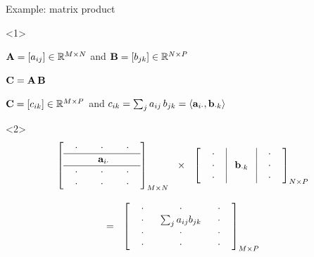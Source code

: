 \documentclass[12pt,aspectratio=1610]{beamer}
\begin{document}
\begin{frame}{Example: matrix product}

\begin{onlyenv}<1>
\begin{center}
$\mathbf{A} = [a_{ij}] \in \mathbb{R}^{M\times N}$ and $\mathbf{B} = [b_{jk}] \in \mathbb{R}^{N\times P}$\bigskip\bigskip

$\mathbf{C} = \mathbf{A} \,\mathbf{B}$\bigskip\bigskip

$\mathbf{C} = [c_{ik}] \in \mathbb{R}^{M\times P}$ and $c_{ik} = \sum_j a_{ij}\,b_{jk} = \langle \mathbf{a}_{i \cdot}, \mathbf{b}_{\cdot k} \rangle$
\end{center}
\end{onlyenv}

\begin{onlyenv}<2>
\footnotesize
\[
\begin{array}{c}
\left[\begin{array}{ccc}
\ \ \cdot \ \ & \ \ \cdot \ \  & \ \ \cdot \ \ \\
\hline
& \ \mb a_{i\cdot} & \\
 \hline
\ \ \cdot \ \ & \ \ \cdot \ \  & \ \ \cdot \ \ \\
\ \ \cdot \ \ & \ \ \cdot \ \  & \ \ \cdot \ \ \\
\end{array}\right]_{M \times N} \ \ \times \ \ \left[\begin{array}{c|c|c}
\ \ \cdot \ \ &   & \ \ \cdot \ \ \\
\ \ \cdot \ \ & \ \mb b_{\cdot k} \  & \ \ \cdot \ \ \\
\ \ \cdot \ \ & & \ \ \cdot \ \ \\
\end{array}\right]_{N \times P}\\
\\
= \ \ \left[\begin{array}{ccc}
\ \ \cdot \ \ & \ \ \cdot \ \  & \ \ \cdot \ \ \\
\ \ \cdot \ \ & \sum_j a_{ij}b_{jk} & \ \ \cdot \ \ \\
\ \ \cdot \ \ & \ \ \cdot \ \  & \ \ \cdot \ \ \\
\ \ \cdot \ \ & \ \ \cdot \ \  & \ \ \cdot \ \ \\
\end{array}\right]_{M \times P}
\end{array}
\]
\end{onlyenv}


\end{frame}
\end{document}
